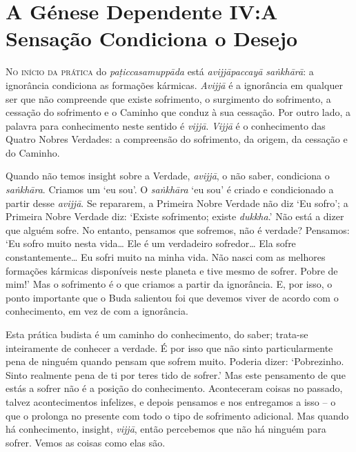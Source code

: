 \chapter{A Génese Dependente IV:\@ A Sensação Condiciona o Desejo}

\lettrine{N}{o início da prática} do \emph{paṭiccasamuppāda} está
\emph{avijjāpaccayā saṅkhārā}: a ignorância condiciona as formações kármicas.
\emph{Avijjā} é a ignorância em qualquer ser que não compreende que existe
sofrimento, o surgimento do sofrimento, a cessação do sofrimento e o Caminho que
conduz à sua cessação. Por outro lado, a palavra para conhecimento neste sentido
é \emph{vijjā}. \emph{Vijjā} é o conhecimento das Quatro Nobres Verdades: a
compreensão do sofrimento, da origem, da cessação e do Caminho.

Quando não temos insight sobre a Verdade, \emph{avijjā}, o não saber, condiciona
o \emph{saṅkhāra}. Criamos um `eu sou'. O \emph{saṅkhāra} `eu sou' é criado e
condicionado a partir desse \emph{avijjā}. Se repararem, a Primeira Nobre Verdade não
diz `Eu sofro'; a Primeira Nobre Verdade diz: `Existe sofrimento; existe
\emph{dukkha}.' Não está a dizer que alguém sofre. No entanto, pensamos que
sofremos, não é verdade? Pensamos: `Eu sofro muito nesta vida\ldots{} Ele é um
verdadeiro sofredor\ldots{} Ela sofre constantemente\ldots{} Eu sofri muito na
minha vida. Não nasci com as melhores formações kármicas disponíveis neste
planeta e tive mesmo de sofrer. Pobre de mim!' Mas o sofrimento é o que criamos
a partir da ignorância. E, por isso, o ponto importante que o Buda salientou foi
que devemos viver de acordo com o conhecimento, em vez de com a ignorância.

Esta prática budista é um caminho do conhecimento, do saber; trata-se
inteiramente de conhecer a verdade. É por isso que não sinto particularmente
pena de ninguém quando pensam que sofrem muito. Poderia dizer: `Pobrezinho.
Sinto realmente pena de ti por teres tido de sofrer.' Mas este pensamento de que
estás a sofrer não é a posição do conhecimento. Aconteceram coisas no passado,
talvez acontecimentos infelizes, e depois pensamos e nos entregamos a isso -- o
que o prolonga no presente com todo o tipo de sofrimento adicional. Mas quando
há conhecimento, insight, \emph{vijjā}, então percebemos que não há ninguém para
sofrer. Vemos as coisas como elas são.

